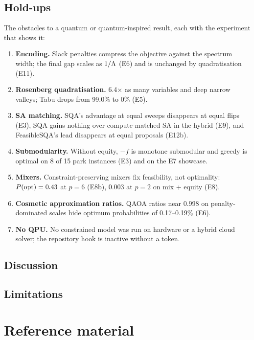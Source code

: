 \documentclass[11pt,a4paper]{report}
\begin{document}
\section{Hold-ups}\label{sec:holdups}
The obstacles to a quantum or quantum-inspired result, each with the experiment that shows it:
\begin{enumerate}
\item \textbf{Encoding.} Slack penalties compress the objective against the spectrum width; the final
gap scales as $1/\Lambda$ (E6) and is unchanged by quadratisation (E11).
\item \textbf{Rosenberg quadratisation.} 6.4$\times$ as many variables and deep narrow valleys; Tabu
drops from 99.0\% to 0\% (E5).
\item \textbf{SA matching.} SQA's advantage at equal sweeps disappears at equal flips (E3), SQA gains
nothing over compute-matched SA in the hybrid (E9), and FeasibleSQA's lead disappears at equal
proposals (E12b).
\item \textbf{Submodularity.} Without equity, $-f$ is monotone submodular and greedy is optimal on 8 of
15 park instances (E3) and on the E7 showcase.
\item \textbf{Mixers.} Constraint-preserving mixers fix feasibility, not optimality: $P(\mathrm{opt})=0.43$ at
$p=6$ (E8b), 0.003 at $p=2$ on mix + equity (E8).
\item \textbf{Cosmetic approximation ratios.} QAOA ratios near 0.998 on penalty-dominated scales hide
optimum probabilities of 0.17--0.19\% (E6).
\item \textbf{No QPU.} No constrained model was run on hardware or a hybrid cloud solver; the
repository hook is inactive without a token.
\end{enumerate}

\section{Discussion}

\section{Limitations}


\chapter{Reference material}
\end{document}
